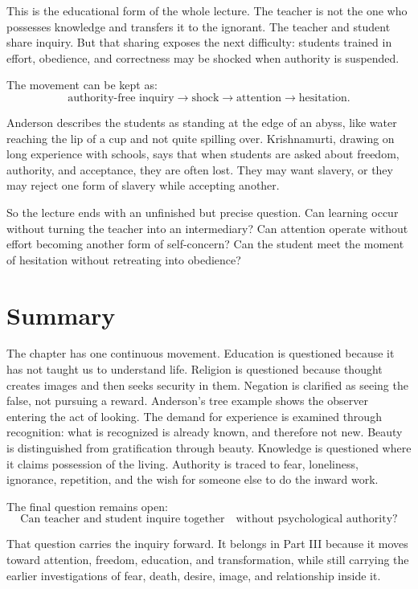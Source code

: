 This is the educational form of the whole lecture. The teacher is not the one who possesses knowledge and transfers it to the ignorant. The teacher and student share inquiry. But that sharing exposes the next difficulty: students trained in effort, obedience, and correctness may be shocked when authority is suspended.

The movement can be kept as:
\begin{equation}
\text{authority-free inquiry}
\longrightarrow
\text{shock}
\longrightarrow
\text{attention}
\longrightarrow
\text{hesitation}.
\end{equation}

Anderson describes the students as standing at the edge of an abyss, like water reaching the lip of a cup and not quite spilling over. Krishnamurti, drawing on long experience with schools, says that when students are asked about freedom, authority, and acceptance, they are often lost. They may want slavery, or they may reject one form of slavery while accepting another.

So the lecture ends with an unfinished but precise question. Can learning occur without turning the teacher into an intermediary? Can attention operate without effort becoming another form of self-concern? Can the student meet the moment of hesitation without retreating into obedience?

\section{Summary}

The chapter has one continuous movement. Education is questioned because it has not taught us to understand life. Religion is questioned because thought creates images and then seeks security in them. Negation is clarified as seeing the false, not pursuing a reward. Anderson's tree example shows the observer entering the act of looking. The demand for experience is examined through recognition: what is recognized is already known, and therefore not new. Beauty is distinguished from gratification through beauty. Knowledge is questioned where it claims possession of the living. Authority is traced to fear, loneliness, ignorance, repetition, and the wish for someone else to do the inward work.

The final question remains open:
\begin{equation}
\text{Can teacher and student inquire together}
\quad
\text{without psychological authority?}
\end{equation}

That question carries the inquiry forward. It belongs in Part III because it moves toward attention, freedom, education, and transformation, while still carrying the earlier investigations of fear, death, desire, image, and relationship inside it.